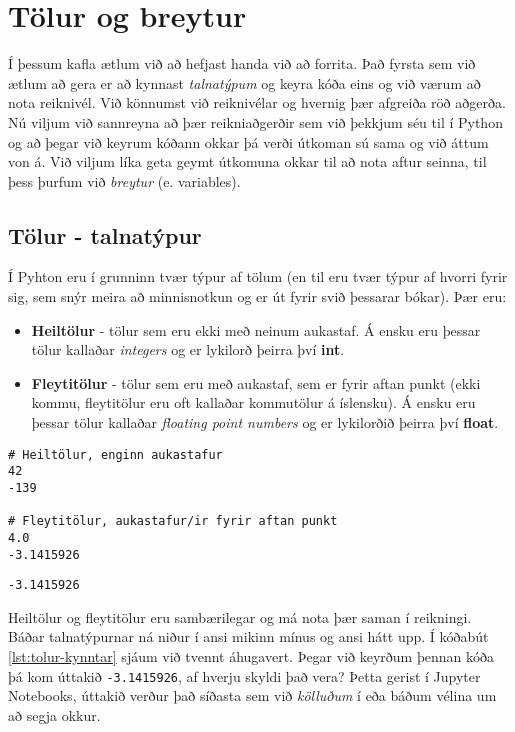 
\chapter{Tölur og breytur}\label{k:tolur}
Í þessum kafla ætlum við að hefjast handa við að forrita. 
Það fyrsta sem við ætlum að gera er að kynnast \emph{talnatýpum} og keyra kóða eins og við værum að nota reiknivél. 
Við könnumst við reiknivélar og hvernig þær afgreiða röð aðgerða. 
Nú viljum við sannreyna að þær reikniaðgerðir sem við þekkjum séu til í Python og að þegar við keyrum kóðann okkar þá verði útkoman sú sama og við áttum von á. 
Við viljum líka geta geymt útkomuna okkar til að nota aftur seinna, til þess þurfum við \emph{breytur} (e. variables).

\section{Tölur - talnatýpur}
Í Pyhton eru í grunninn tvær týpur af tölum (en til eru tvær týpur af hvorri fyrir sig, sem snýr meira að minnisnotkun og er út fyrir svið þessarar bókar). 
Þær eru:

\begin{itemize}
	\item \textbf{Heiltölur} - tölur sem eru ekki með neinum aukastaf. 
	Á ensku eru þessar tölur kallaðar \textit{integers} og er lykilorð þeirra því \textbf{int}.
	\item \textbf{Fleytitölur} - tölur sem eru með aukastaf, sem er fyrir aftan punkt (ekki kommu, fleytitölur eru oft kallaðar kommutölur á íslensku). 
	Á ensku eru þessar tölur kallaðar \textit{floating point numbers} og er lykilorðið þeirra því \textbf{float}.
\end{itemize}

\begin{lstlisting}[caption=Heiltölur og fleytitölur, label=lst:tolur-kynntar]
# Heiltölur, enginn aukastafur
42
-139

# Fleytitölur, aukastafur/ir fyrir aftan punkt
4.0
-3.1415926
\end{lstlisting}
\lstset{style=uttak}
\begin{lstlisting}
-3.1415926
\end{lstlisting}
\lstset{style=venjulegt}

Heiltölur og fleytitölur eru sambærilegar og má nota þær saman í reikningi.
Báðar talnatýpurnar ná niður í ansi mikinn mínus og ansi hátt upp.
Í kóðabút \ref{lst:tolur-kynntar} sjáum við tvennt áhugavert.
Þegar við keyrðum þennan kóða þá kom úttakið \texttt{-3.1415926}, af hverju skyldi það vera?
Þetta gerist í Jupyter Notebooks, úttakið verður það síðasta sem við \emph{kölluðum} í eða báðum vélina um að segja okkur.

